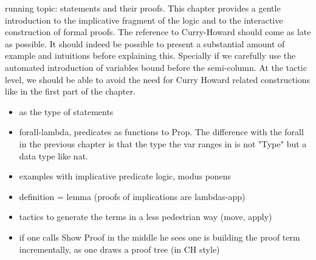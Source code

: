 
%
%
%

running topic: statements and their proofs. This chapter provides a gentle
introduction to the implicative fragment of the logic and to the
interactive construction of formal proofs. The reference to
Curry-Howard should come as late as possible. It should indeed be
possible to present a substantial amount of example and intuitions
before explaining this. Specially if we carefully use the automated
introduction of variables bound before the semi-column. At the tactic
level, we should be able to avoid the need for Curry Howard related
constructions like  in the first part of the chapter.

\begin{itemize}
\item {} as the type of statements
\item forall-lambda, predicates as functions to Prop.  The difference with the forall in the previous chapter is that the type the var ranges in is not "Type" but a data type like nat.
\item examples with implicative predicate logic, modus ponens
\item definition = lemma (proofs of implications are lambdas-app)
\item tactics to generate the terms in a less pedestrian way (move, apply)
\item if one calls Show Proof in the middle he sees one is building
	the proof term incrementally, as one draws a proof tree (in CH style)
\end{itemize}

